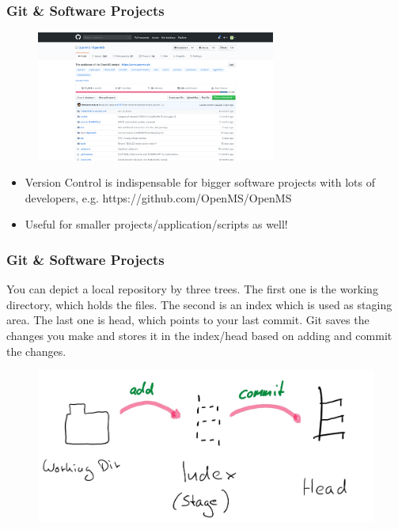 \documentclass{beamer} %
\begin{document}
\begin{frame}[t]
\frametitle{Git \& Software Projects}
\begin{figure}
    \begin{center}
    	\includegraphics[width=0.7\textwidth]{assets/OpenMS.png}
    \end{center}
\end{figure} 
\begin{itemize}
    \setlength\itemsep{1em}
	\item Version Control is indispensable for bigger software projects with lots of developers, 
	e.g. https://github.com/OpenMS/OpenMS
    \item Useful for smaller projects/application/scripts as well! \newline
\end{itemize}
\end{frame}

\begin{frame}[t]
\frametitle{Git \& Software Projects}
You can depict a local repository by three trees. The first one is the working directory, which holds the files. The second is an index which is used as staging area. The last one is head, which points to your last commit. Git saves the changes you make and stores it in the index/head based on adding and commit the changes.
\begin{figure}
    \begin{center}
    	\includegraphics[width=\textwidth]{assets/git.jpg}
    \end{center}
\end{figure}
\end{frame}
\end{document}
